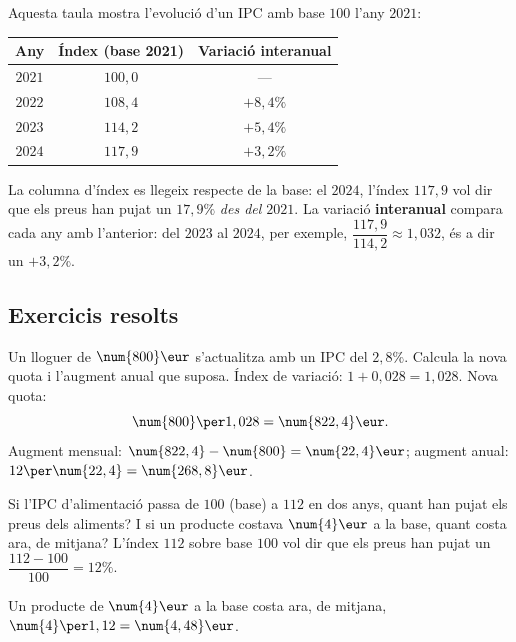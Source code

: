 \begin{exemple}
Aquesta taula mostra l'evolució d'un IPC amb base $100$ l'any $2021$:
\begin{center}
\renewcommand{\arraystretch}{1.2}
\begin{tabular}{c c c}
\toprule
\textbf{Any} & \textbf{Índex (base 2021)} & \textbf{Variació interanual} \\
\midrule
$2021$ & $100,0$ & — \\
$2022$ & $108,4$ & $+8,4\%$ \\
$2023$ & $114,2$ & $+5,4\%$ \\
$2024$ & $117,9$ & $+3,2\%$ \\
\bottomrule
\end{tabular}
\end{center}
La columna d'índex es llegeix respecte de la base: el $2024$, l'índex $117,9$ vol dir
que els preus han pujat un $17,9\%$ \emph{des del $2021$}. La variació
\textbf{interanual} compara cada any amb l'anterior: del $2023$ al $2024$, per exemple,
$\dfrac{117,9}{114,2}\approx 1,032$, és a dir un $+3,2\%$.
\end{exemple}

\subsection{Exercicis resolts}

\begin{exresolt}
Un lloguer de $\num{800}\eur$ s'actualitza amb un IPC del $2,8\%$. Calcula la nova
quota i l'augment anual que suposa.
\solucio
Índex de variació: $1+0,028=1,028$. Nova quota:
\[
\num{800}\per 1,028=\num{822,4}\eur.
\]
Augment mensual: $\num{822,4}-\num{800}=\num{22,4}\eur$; augment anual:
$12\per\num{22,4}=\num{268,8}\eur$.
\end{exresolt}

\begin{exresolt}
Si l'IPC d'alimentació passa de $100$ (base) a $112$ en dos anys, quant han pujat els
preus dels aliments? I si un producte costava $\num{4}\eur$ a la base, quant costa
ara, de mitjana?
\solucio
L'índex $112$ sobre base $100$ vol dir que els preus han pujat un
$\dfrac{112-100}{100}=12\%$.

Un producte de $\num{4}\eur$ a la base costa ara, de mitjana,
$\num{4}\per 1,12=\num{4,48}\eur$.
\end{exresolt}

